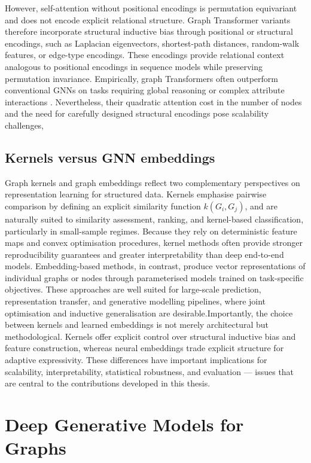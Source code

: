 However, self-attention without positional encodings is permutation equivariant and does not encode explicit relational structure.
Graph Transformer variants therefore incorporate structural inductive bias
through positional or structural encodings, such as Laplacian eigenvectors,
shortest-path distances, random-walk features, or edge-type encodings.
These encodings provide relational context analogous to positional encodings
in sequence models while preserving permutation invariance.
Empirically, graph Transformers often outperform conventional GNNs on tasks
requiring global reasoning or complex attribute interactions
\citep{dwivedi2021graph,ying2021transformers,kreuzer2021rethinking,rampavsek2022recipe}.
Nevertheless, their quadratic attention cost in the number of nodes and the
need for carefully designed structural encodings pose scalability challenges,

\subsection{Kernels versus GNN embeddings}

Graph kernels and graph embeddings reflect two complementary perspectives
on representation learning for structured data.
Kernels emphasise pairwise comparison by defining an explicit similarity
function $k(G_i,G_j)$, and are naturally suited to similarity assessment,
ranking, and kernel-based classification, particularly in small-sample
regimes. Because they rely on deterministic feature maps and convex
optimisation procedures, kernel methods often provide stronger
reproducibility guarantees and greater interpretability than deep
end-to-end models.
Embedding-based methods, in contrast, produce vector representations of
individual graphs or nodes through parameterised models trained on
task-specific objectives. These approaches are well suited for large-scale
prediction, representation transfer, and generative modelling pipelines,
where joint optimisation and inductive generalisation are desirable.Importantly, the choice between kernels and learned embeddings is not
merely architectural but methodological. Kernels offer explicit control
over structural inductive bias and feature construction, whereas neural
embeddings trade explicit structure for adaptive expressivity.
These differences have important implications for scalability,
interpretability, statistical robustness, and evaluation —
issues that are central to the contributions developed in this thesis.


\section{Deep Generative Models for Graphs}
\label{sec:related:generation}


